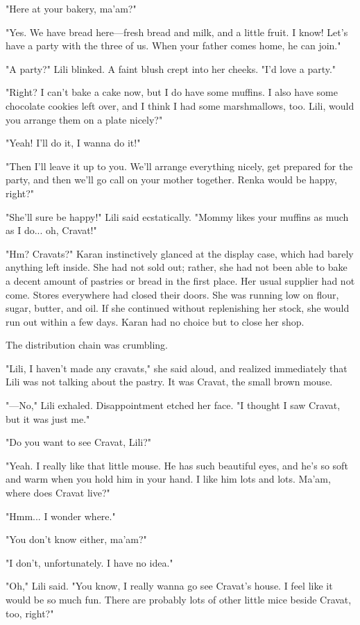 "Here at your bakery, ma'am?"

"Yes. We have bread here---fresh bread and milk, and a little fruit. I
know! Let's have a party with the three of us. When your father comes
home, he can join."

"A party?" Lili blinked. A faint blush crept into her cheeks. "I'd love
a party."

"Right? I can't bake a cake now, but I do have some muffins. I also have
some chocolate cookies left over, and I think I had some marshmallows,
too. Lili, would you arrange them on a plate nicely?"

"Yeah! I'll do it, I wanna do it!"

"Then I'll leave it up to you. We'll arrange everything nicely, get
prepared for the party, and then we'll go call on your mother together.
Renka would be happy, right?"

"She'll sure be happy!" Lili said ecstatically. "Mommy likes your
muffins as much as I do... oh, Cravat!"

"Hm? Cravats?" Karan instinctively glanced at the display case, which
had barely anything left inside. She had not sold out; rather, she had
not been able to bake a decent amount of pastries or bread in the first
place. Her usual supplier had not come. Stores everywhere had closed
their doors. She was running low on flour, sugar, butter, and oil. If
she continued without replenishing her stock, she would run out within a
few days. Karan had no choice but to close her shop.

The distribution chain was crumbling.

"Lili, I haven't made any cravats," she said aloud, and realized
immediately that Lili was not talking about the pastry. It was Cravat,
the small brown mouse.

"---No," Lili exhaled. Disappointment etched her face. "I thought I saw
Cravat, but it was just me."

"Do you want to see Cravat, Lili?"

"Yeah. I really like that little mouse. He has such beautiful eyes, and
he's so soft and warm when you hold him in your hand. I like him lots
and lots. Ma'am, where does Cravat live?"

"Hmm... I wonder where."

"You don't know either, ma'am?"

"I don't, unfortunately. I have no idea."

"Oh," Lili said. "You know, I really wanna go see Cravat's house. I feel
like it would be so much fun. There are probably lots of other little
mice beside Cravat, too, right?"

